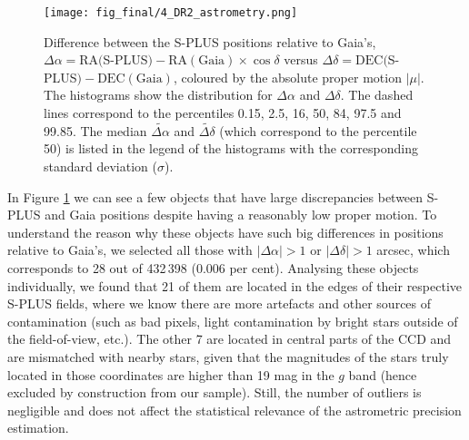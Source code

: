 \documentclass[fleqn,usenatbib]{mnras}
\begin{document}
\begin{figure}
\begin{center}
\texttt{[image: fig\_final/4\_DR2\_astrometry.png]}
\caption{Difference between the S-PLUS positions relative to Gaia's, $\Delta\alpha = \mathrm{RA(}$S-PLUS$) - \mathrm{RA(Gaia)} \times \cos \delta$ versus $\Delta\delta = \mathrm{DEC(}$S-PLUS$) - \mathrm{DEC(Gaia)}$, coloured by the absolute proper motion $|\mu|$. The histograms show the distribution for $\Delta\alpha$ and $\Delta\delta$. The dashed lines correspond to the percentiles 0.15, 2.5, 16, 50, 84, 97.5 and 99.85. The median $\widetilde{\Delta\alpha}$ and $\widetilde{\Delta\delta}$ (which correspond to the percentile 50) is listed in the legend of the histograms with the corresponding standard deviation ($\sigma$).}
\label{fig:astrometry}
\end{center}
\end{figure}

In Figure \ref{fig:astrometry} we can see a few objects that have large discrepancies between S-PLUS and Gaia positions despite having a reasonably low proper motion. To understand the reason why these objects have such big differences in positions relative to Gaia's, we selected all those with $|\Delta\alpha| > 1$ or $|\Delta\delta| > 1$ arcsec, which corresponds to 28 out of 432\,398 (0.006 per cent). Analysing these objects individually, we found that 21 of them are located in the edges of their respective S-PLUS fields, where we know there are more artefacts and other sources of contamination (such as bad pixels, light contamination by bright stars outside of the field-of-view, etc.). The other 7 are located in central parts of the CCD and are mismatched with nearby stars, given that the magnitudes of the stars truly located in those coordinates are higher than 19 mag in the $g$ band (hence excluded by construction from our sample). Still, the number of outliers is negligible and does not affect the statistical relevance of the astrometric precision estimation.







\end{document}

